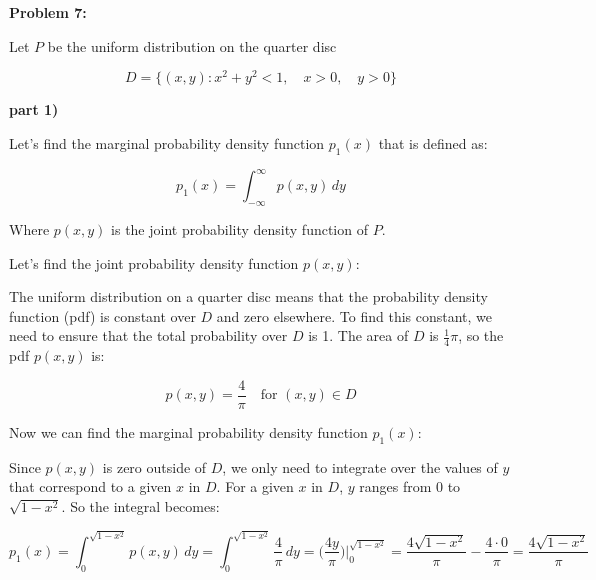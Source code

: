 \textbf{Problem 7:}

\singlespacing

Let $P$ be the uniform distribution on the quarter disc

\singlespacing

\begin{equation}
    D = \{(x, y): x^2 + y^2 < 1,\quad x > 0,\quad y > 0\}
\end{equation}

\singlespacing

\textbf{part 1)}
\singlespacing

Let's find the marginal probability density function $p_1(x)$ that
is defined as:

\singlespacing

\begin{equation}
    p_1(x) = \int_{-\infty}^{\infty} p(x, y) \, dy
\end{equation}

\singlespacing

Where $p(x, y)$ is the joint probability density function of $P$.

\singlespacing

Let's find the joint probability density function $p(x, y)$:

\singlespacing

The uniform distribution on a quarter disc means that the probability density function (pdf) is constant over \( D \) and zero elsewhere. To find this constant, we need to ensure that the total probability over \( D \) is 1. The area of \( D \) is \( \frac{1}{4}\pi \), so the pdf \( p(x, y) \) is:

\[ p(x, y) = \frac{4}{\pi} \quad \text{for } (x, y) \in D \]

\singlespacing

Now we can find the marginal probability density function $p_1(x)$:

\singlespacing

Since \( p(x, y) \) is zero outside of \( D \), we only need to integrate over the values of \( y \) that correspond to a given \( x \) in \( D \). For a given \( x \) in \( D \), \( y \) ranges from 0 to \( \sqrt{1 - x^2} \). So the integral becomes:

\singlespacing

\begin{equation}
    p_1(x) = \int_{0}^{\sqrt{1 - x^2}} p(x, y) \, dy = \int_{0}^{\sqrt{1 - x^2}} \frac{4}{\pi} \, dy = \Big( \frac{4y}{\pi} \Big)\Big|_{0}^{\sqrt{1 - x^2}} = \frac{4\sqrt{1 - x^2}}{\pi} - \frac{4\cdot0}{\pi} = \frac{4\sqrt{1 - x^2}}{\pi}
\end{equation}

